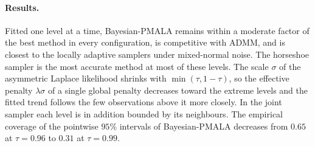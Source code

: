 \paragraph{Results.} Fitted one level at a time, Bayesian-PMALA remains within a moderate factor of the best method in every configuration, is competitive with ADMM, and is closest to the locally adaptive samplers under mixed-normal noise. The horseshoe sampler is the most accurate method at most of these levels. The scale $\sigma$ of the asymmetric Laplace likelihood shrinks with $\min(\tau, 1-\tau)$, so the effective penalty $\lambda\sigma$ of a single global penalty decreases toward the extreme levels and the fitted trend follows the few observations above it more closely. In the joint sampler each level is in addition bounded by its neighbours. The empirical coverage of the pointwise $95\%$ intervals of Bayesian-PMALA decreases from $0.65$ at $\tau=0.96$ to $0.31$ at $\tau=0.99$.

